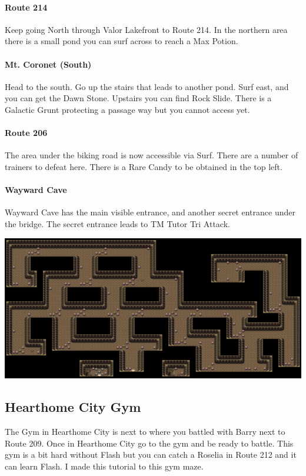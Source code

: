 \documentclass[11pt]{article}
\begin{document}
\paragraph{Route 214}
Keep going North through Valor Lakefront to Route 214.
In the northern area there is a small pond you can surf across to reach
a Max Potion.

\paragraph{Mt. Coronet (South)}
Head to the south.
Go up the stairs that leads to another pond.
Surf east, and you can get the Dawn Stone.
Upstairs you can find Rock Slide.
There is a Galactic Grunt protecting a passage way but you cannot access yet.

\paragraph{Route 206}
The area under the biking road is now accessible via Surf.
There are a number of trainers to defeat here.
There is a Rare Candy to be obtained in the top left.



\paragraph{Wayward Cave}

Wayward Cave has the main visible entrance, and another secret entrance under
the bridge.
The secret entrance leads to TM Tutor Tri Attack.

\includegraphics[width=\textwidth]{walkthrough/Sinnoh/wayward-cave}



\subsection{Hearthome City Gym}\label{subsec:hearthome-city-gym}
The Gym in Hearthome City is next to where you battled with Barry next to Route 209.
Once in Hearthome City go to the gym and be ready to battle.
This gym is a bit hard without Flash but you can catch a Roselia in Route 212
and it can learn Flash.
I made this tutorial to this gym maze.
\end{document}
